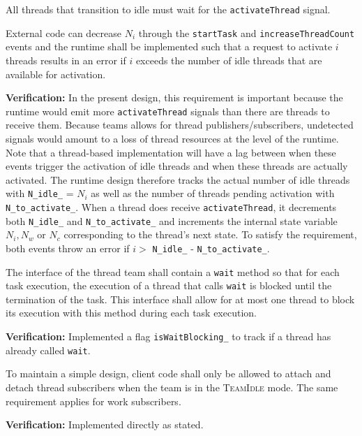 \documentclass{article}
\newcommand{\TeamIdle}          {\textsc{TeamIdle}}
\begin{document}
\begin{req}
All threads that transition to idle must wait for the \texttt{activateThread}
signal.
\label{req:IdleActivateThread}
\end{req}

\begin{req}
External code can decrease $N_i$ through the \texttt{startTask} and
\texttt{increaseThreadCount} events and the runtime shall be implemented such
that a request to activate $i$ threads results in an error if $i$ exceeds the
number of idle threads that are available for activation.
\end{req}
\textbf{Verification:}\hspace{0.125in}  In the present design, this requirement
is important because the runtime would emit more \texttt{activateThread} signals
than there are threads to receive them.  Because teams allows for thread
publishers/subscribers, undetected signals would amount to a loss of thread
resources at the level of the runtime.  Note that a thread-based implementation
will have a lag between when these events trigger the activation of idle threads
and when these threads are actually activated.  The runtime design therefore
tracks the actual number of idle threads with \texttt{N\_idle\_} = $N_i$ as well
as the number of threads pending activation with \texttt{N\_to\_activate\_}.
When a thread does receive \texttt{activateThread}, it decrements both
\texttt{N\_idle\_} and \texttt{N\_to\_activate\_} and increments the internal
state variable $N_i, N_w$ or $N_c$ corresponding to the thread's next state.
To satisfy the requirement, both events throw an error if $i > $
\texttt{N\_idle\_} - \texttt{N\_to\_activate\_}.

\begin{req}
\label{req:Runtime_OneWait}
The interface of the thread team shall contain a \texttt{wait} method so that
for each task execution, the execution of a thread that calls \texttt{wait} is
blocked until the termination of the task.  This interface shall allow for at
most one thread to block its execution with this method during each task
execution.
\end{req}
\textbf{Verification:}\hspace{0.125in}  Implemented a flag
\texttt{isWaitBlocking\_} to track if a thread has already called \texttt{wait}.

\begin{req}
To maintain a simple design, client code shall only be allowed to attach and
detach thread subscribers when the team is in the {\TeamIdle} mode.  The same
requirement applies for work subscribers.
\end{req}
\textbf{Verification:}\hspace{0.125in} Implemented directly as stated.
\end{document}
